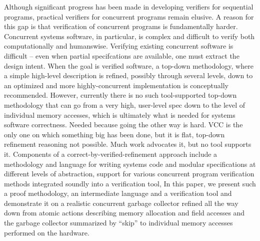 Although significant progress has been made in developing verifiers for sequential programs, practical verifiers for concurrent programs remain elusive.
A reason for this gap is that verification of concurrent programs is fundamentally harder.
Concurrent systems software,  in particular, is complex and difficult to verify both computationally and humanswise.
Verifying existing concurrent software is difficult -- even when partial specifcations are available, one must extract the design intent. 
When the goal is verified software, a top-down methodology, where a simple high-level description is refined, possibly through several levels, down to an optimized and more highly-concurrent implementation is conceptually recommended. 
However, currently there is no such tool-supported top-down methodology that can go from a very high, user-level spec down to the level of individual memory accesses, which is ultimately what is needed for systems software correctness.  
Needed because going the other way is hard. VCC is the only one on which something big has been done, but it is flat, top-down refinement reasoning not possible. 
Much work advocates it, but no tool supports it. 
Components of a correct-by-verified-refinement approach include a methodology and language for writing systems code and modular specifications at different levels of abstraction, support for various concurrent program verification methods integrated soundly into a verification tool, 
In this paper, we present such a proof methodology, an intermediate language and a verification tool and demonstrate it on a realistic concurrent garbage collector refined all the way down from atomic actions describing memory allocation and field accesses and the garbage collector summarized by ``skip'' to individual memory accesses performed on the hardware. 

